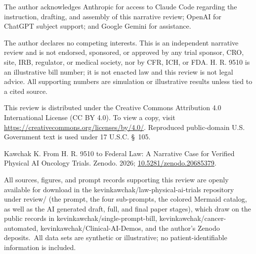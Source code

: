 
The author acknowledges Anthropic for access to Claude Code regarding the instruction,
drafting, and assembly of this narrative review; OpenAI for ChatGPT subject
support; and Google Gemini for assistance.

The author declares no competing interests. This is an independent narrative
review and is not endorsed, sponsored, or approved by any trial sponsor, CRO,
site, IRB, regulator, or medical society, nor by CFR, ICH, or FDA. H. R. 9510 is
an illustrative bill number; it is not enacted law and this review is not legal
advice. All supporting numbers are simulation or illustrative results unless tied
to a cited source.

This review is distributed under the Creative Commons Attribution 4.0
International License (CC BY 4.0). To view a copy, visit
\url{https://creativecommons.org/licenses/by/4.0/}. Reproduced public-domain U.S.
Government text is used under 17 U.S.C. \S~105.

Kawchak K. From H. R. 9510 to Federal Law: A Narrative Case for Verified Physical AI Oncology Trials. Zenodo. 2026;
\href{https://doi.org/10.5281/zenodo.20685379}{10.5281/zenodo.20685379}.

All sources, figures, and prompt records supporting this review are openly
available for download in the kevinkawchak/law-physical-ai-trials repository under review/ (the prompt, the four sub-prompts, the colored Mermaid catalog,
as well as the AI generated draft, full, and final paper stages), which draw on the public records in kevinkawchak/single-prompt-bill, kevinkawchak/cancer-automated, kevinkawchak/Clinical-AI-Demos, and the author's Zenodo deposits.\ All data
sets are synthetic or illustrative; no patient-identifiable information is
included.
